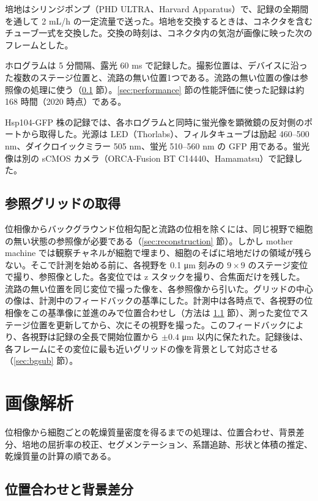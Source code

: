 培地はシリンジポンプ（PHD ULTRA、Harvard Apparatus）で、記録の全期間を通して 2 mL/h の一定流量で送った。培地を交換するときは、コネクタを含むチューブ一式を交換した。交換の時刻は、コネクタ内の気泡が画像に映った次のフレームとした。

ホログラムは 5 分間隔、露光 60 ms で記録した。撮影位置は、デバイスに沿った複数のステージ位置と、流路の無い位置1つである。流路の無い位置の像は参照像の処理に使う（\ref{sec:grid_acq} 節）。\ref{sec:performance} 節の性能評価に使った記録は約 168 時間（2020 時点）である。

Hsp104-GFP 株の記録では、各ホログラムと同時に蛍光像を顕微鏡の反対側のポートから取得した。光源は LED（Thorlabs）、フィルタキューブは励起 460--500 nm、ダイクロイックミラー 505 nm、蛍光 510--560 nm の GFP 用である。蛍光像は別の sCMOS カメラ（ORCA-Fusion BT C14440、Hamamatsu）で記録した。

\subsection{参照グリッドの取得}
\label{sec:grid_acq}

位相像からバックグラウンド位相勾配と流路の位相を除くには、同じ視野で細胞の無い状態の参照像が必要である（\ref{sec:reconstruction} 節）。しかし mother machine では観察チャネルが細胞で埋まり、細胞のそばに培地だけの領域が残らない。そこで計測を始める前に、各視野を 0.1 μm 刻みの $9 \times 9$ のステージ変位で撮り、参照像とした。各変位では z スタックを撮り、合焦面だけを残した。流路の無い位置を同じ変位で撮った像を、各参照像から引いた。グリッドの中心の像は、計測中のフィードバックの基準にした。計測中は各時点で、各視野の位相像をこの基準像に並進のみで位置合わせし（方法は \ref{sec:registration} 節）、測った変位でステージ位置を更新してから、次にその視野を撮った。このフィードバックにより、各視野は記録の全長で開始位置から $\pm 0.4$ μm 以内に保たれた。記録後は、各フレームにその変位に最も近いグリッドの像を背景として対応させる（\ref{sec:bgsub} 節）。

\section{画像解析}
\label{sec:analysis}

位相像から細胞ごとの乾燥質量密度を得るまでの処理は、位置合わせ、背景差分、培地の屈折率の校正、セグメンテーション、系譜追跡、形状と体積の推定、乾燥質量の計算の順である。

\subsection{位置合わせと背景差分}
\label{sec:registration}
\label{sec:bgsub}

